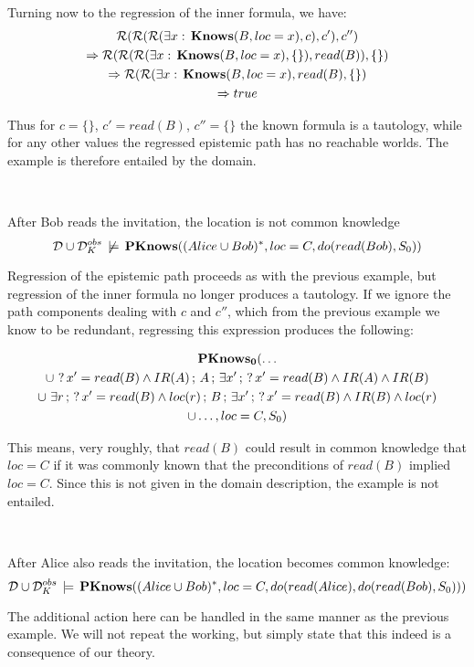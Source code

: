 Turning now to the regression of the inner formula, we have:\begin{gather*}
\mathcal{R}(\mathcal{R}(\mathcal{R}(\exists x:\,\mathbf{Knows}(B,loc=x),c),c'),c'')\\
\Rightarrow\mathcal{R}(\mathcal{R}(\mathcal{R}(\exists x:\,\mathbf{Knows}(B,loc=x),\{\}),read(B)),\{\})\\
\Rightarrow\mathcal{R}(\mathcal{R}(\exists x:\,\mathbf{Knows}(B,loc=x),read(B),\{\})\\
\Rightarrow true\end{gather*}


Thus for $c=\{\}$, $c'=read(B)$, $c''=\{\}$ the known formula is
a tautology, while for any other values the regressed epistemic path
has no reachable worlds. The example is therefore entailed by the
domain.

~

\begin{example}
After Bob reads the invitation, the location is not common knowledge\[
\mathcal{D}\cup\mathcal{D}_{K}^{obs}\,\not\models\,\mathbf{PKnows}((Alice\cup Bob)^{*},loc=C,do(read(Bob),S_{0}))\]

\end{example}
Regression of the epistemic path proceeds as with the previous example,
but regression of the inner formula no longer produces a tautology.
If we ignore the path components dealing with $c$ and $c''$, which
from the previous example we know to be redundant, regressing this
expression produces the following:

\begin{multline*}
\mathbf{PKnows_{0}}(\dots\\
\cup\,\,?\, x'=read(B)\wedge IR(A)\,;\, A\,;\,\exists x'\,;\,?\, x'=read(B)\wedge IR(A)\wedge IR(B)\\
\cup\,\,\exists r\,;\,?\, x'=read(B)\wedge loc(r)\,;\, B\,;\,\exists x'\,;\,?\, x'=read(B)\wedge IR(B)\wedge loc(r)\\
\cup\dots,loc=C,S_{0})\end{multline*}


This means, very roughly, that $read(B)$ could result in common knowledge
that $loc=C$ if it was commonly known that the preconditions of $read(B)$
implied $loc=C$. Since this is not given in the domain description,
the example is not entailed.

~

\begin{example}
After Alice also reads the invitation, the location becomes common knowledge:\[
\mathcal{D}\cup\mathcal{D}_{K}^{obs}\,\models\,\mathbf{PKnows}((Alice\cup Bob)^{*},loc=C,do(read(Alice),do(read(Bob),S_{0})))\]

\end{example}
The additional action here can be handled in the same manner as the
previous example. We will not repeat the working, but simply state
that this indeed is a consequence of our theory.


